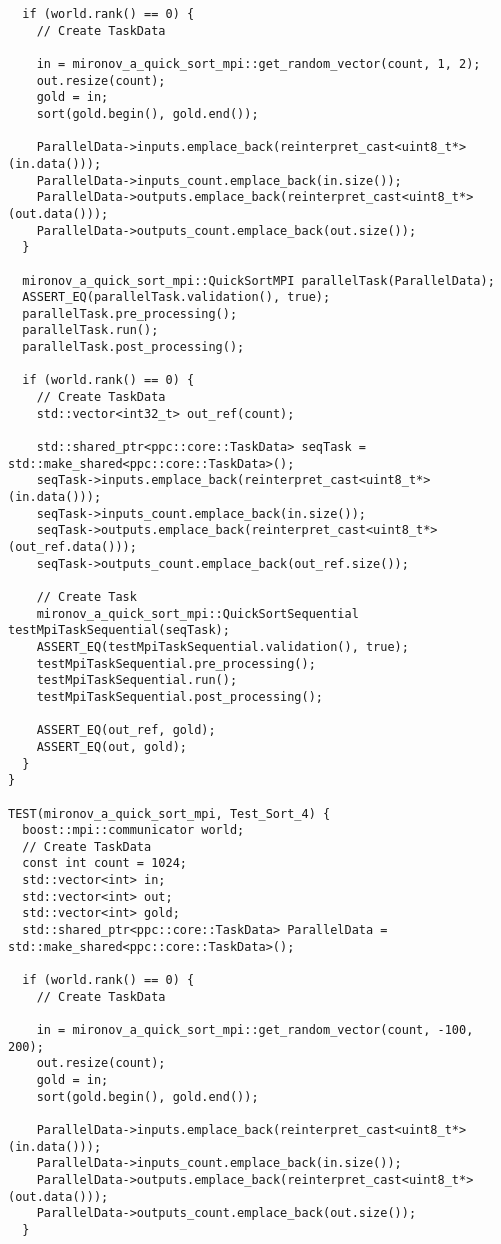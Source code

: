 \documentclass[12pt]{article}
\begin{document}
\begin{lstlisting}
  if (world.rank() == 0) {
    // Create TaskData

    in = mironov_a_quick_sort_mpi::get_random_vector(count, 1, 2);
    out.resize(count);
    gold = in;
    sort(gold.begin(), gold.end());

    ParallelData->inputs.emplace_back(reinterpret_cast<uint8_t*>(in.data()));
    ParallelData->inputs_count.emplace_back(in.size());
    ParallelData->outputs.emplace_back(reinterpret_cast<uint8_t*>(out.data()));
    ParallelData->outputs_count.emplace_back(out.size());
  }

  mironov_a_quick_sort_mpi::QuickSortMPI parallelTask(ParallelData);
  ASSERT_EQ(parallelTask.validation(), true);
  parallelTask.pre_processing();
  parallelTask.run();
  parallelTask.post_processing();

  if (world.rank() == 0) {
    // Create TaskData
    std::vector<int32_t> out_ref(count);

    std::shared_ptr<ppc::core::TaskData> seqTask = std::make_shared<ppc::core::TaskData>();
    seqTask->inputs.emplace_back(reinterpret_cast<uint8_t*>(in.data()));
    seqTask->inputs_count.emplace_back(in.size());
    seqTask->outputs.emplace_back(reinterpret_cast<uint8_t*>(out_ref.data()));
    seqTask->outputs_count.emplace_back(out_ref.size());

    // Create Task
    mironov_a_quick_sort_mpi::QuickSortSequential testMpiTaskSequential(seqTask);
    ASSERT_EQ(testMpiTaskSequential.validation(), true);
    testMpiTaskSequential.pre_processing();
    testMpiTaskSequential.run();
    testMpiTaskSequential.post_processing();

    ASSERT_EQ(out_ref, gold);
    ASSERT_EQ(out, gold);
  }
}

TEST(mironov_a_quick_sort_mpi, Test_Sort_4) {
  boost::mpi::communicator world;
  // Create TaskData
  const int count = 1024;
  std::vector<int> in;
  std::vector<int> out;
  std::vector<int> gold;
  std::shared_ptr<ppc::core::TaskData> ParallelData = std::make_shared<ppc::core::TaskData>();

  if (world.rank() == 0) {
    // Create TaskData

    in = mironov_a_quick_sort_mpi::get_random_vector(count, -100, 200);
    out.resize(count);
    gold = in;
    sort(gold.begin(), gold.end());

    ParallelData->inputs.emplace_back(reinterpret_cast<uint8_t*>(in.data()));
    ParallelData->inputs_count.emplace_back(in.size());
    ParallelData->outputs.emplace_back(reinterpret_cast<uint8_t*>(out.data()));
    ParallelData->outputs_count.emplace_back(out.size());
  }


\end{lstlisting}
\end{document}
